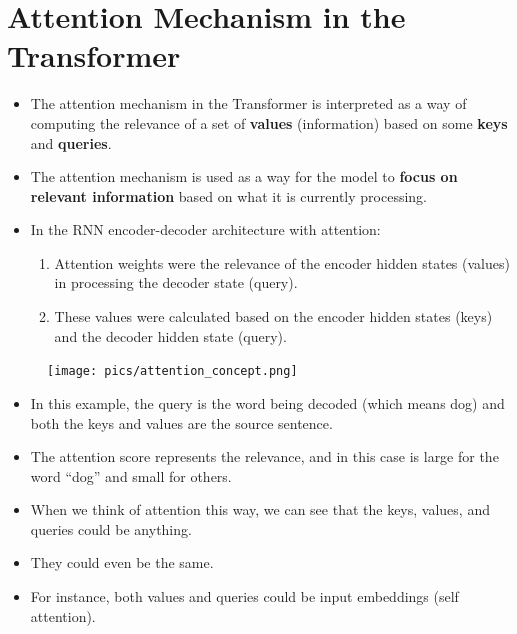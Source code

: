 \section{Attention Mechanism in the Transformer}
\begin{itemize}
 \item The attention mechanism in the Transformer is interpreted as a way of computing the relevance of a set of \textbf{values} (information) based on some \textbf{keys} and \textbf{queries}. 
 
 \item The attention mechanism is used as a way for the model to \textbf{focus on relevant information} based on what it is currently processing.
 
 \item In the RNN encoder-decoder architecture with attention:
 

 \begin{enumerate}
 \item Attention weights were the relevance of the encoder hidden states (values) in processing the decoder state (query).
 
 \item These values were calculated based on the encoder hidden states (keys) and the decoder hidden state (query). 
 \end{enumerate}

 
\end{itemize}


    \begin{figure}[h]
        	\texttt{[image: pics/attention\_concept.png]}
        \end{figure}  

\begin{itemize}        
\item In this example, the query is the word being decoded (which means dog) and both the keys and values are the source sentence. 
\item The attention score represents the relevance, and in this case is large for the word “dog” and small for others.
 \item When we think of attention this way, we can see that the keys, values, and queries could be anything. 
 \item They could even be the same. 
 \item For instance, both values and queries could be input embeddings (self attention). 
\end{itemize}


